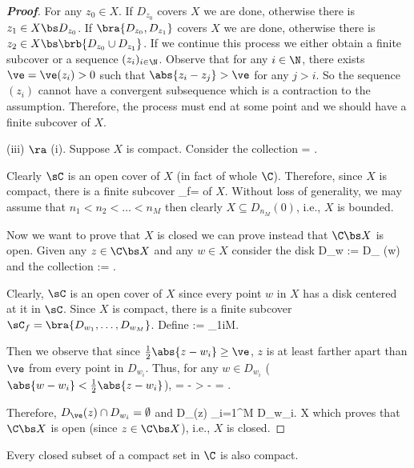 \begin{proof}[\bf Proof]
For any $z_0\in X$. If $D_{z_0}$ covers $X$ we are done, otherwise there is $z_1\in X\bs D_{z_0}$. If $\bra{D_{z_0},D_{z_1}}$ covers $X$ we are done, otherwise there is $z_2\in X\bs\brb{D_{z_0}\cup D_{z_1}}$. If we continue this process we either obtain a finite subcover or a sequence $(z_i)_{i\in \N}$. Observe that for any $i\in \N$, there exists $\ve = \ve(z_i)>0$ such that $\abs{z_i - z_j}>\ve$ for any $j>i$. So the sequence $(z_i)$ cannot have a convergent subsequence which is a contraction to the assumption. Therefore, the process must end at some point and we should have a finite subcover of $X$.

\item [(iii)] $\ra$ (i). Suppose $X$ is compact. Consider the collection
\be
\sC = .
\ee

Clearly $\sC$ is an open cover of $X$ (in fact of whole $\C$). Therefore, since $X$ is compact, there is a finite subcover
\be
\sC_f= 
\ee
of $X$. Without loss of generality, we may assume that $n_1<n_2 < \dots < n_M$ then clearly $X \subseteq D_{n_M}(0)$, i.e., $X$ is bounded.

Now we want to prove that $X$ is closed we can prove instead that $\C\bs X$ is open. Given any $z\in \C\bs X$ and any $w\in X$ consider the disk
\be
D_w := D_{ }(w)
\ee
and the collection
\be
\sC := .
\ee

Clearly, $\sC$ is an open cover of $X$ since every point $w$ in $X$ has a disk centered at it in $\sC$. Since $X$ is compact, there is a finite subcover $\sC_f = \bra{D_{w_1},\dots,D_{w_M}}$. Define
\be
\ve := \min_{1\leq i\leq M}.
\ee

Then we observe that since $\frac 12 \abs{z - w_i} \geq \ve$, $z$ is at least farther apart than $\ve$ from every point in $D_{w_i}$. Thus, for any $w\in D_{w_i}$ ($\abs{w-w_i} < \frac 12 \abs{z-w_i}$),
\be
{} =  \geq {} -  >  -   =   \geq \ve.
\ee

Therefore, $D_{\ve}(z) \cap D_{w_i}= \emptyset$ and
\be
D_{\ve}(z) \subseteq \C\left\bs \bigcup_{i=1}^M D_{w_i}\right. \subseteq \C \bs X
\ee
which proves that $\C\bs X$ is open (since $z\in \C\bs X$), i.e., $X$ is closed.
\een
\end{proof}

\begin{proposition}
Every closed subset of a compact set in $\C$ is also compact.
\end{proposition}

